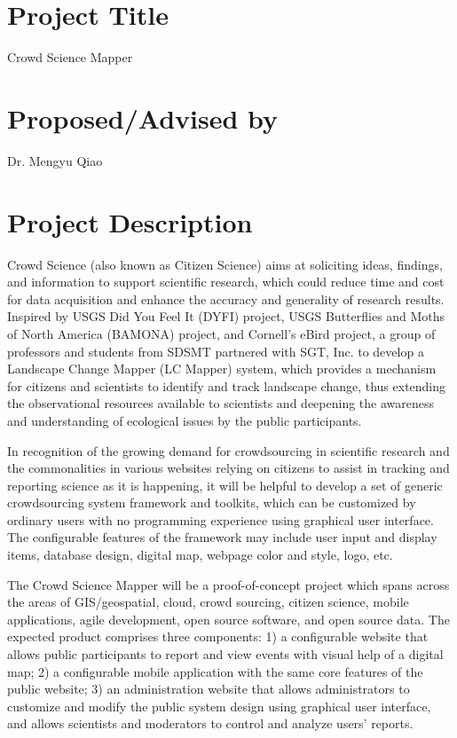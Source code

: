 
\section{Project Title} 
Crowd Science Mapper         

\section{Proposed/Advised by}   
Dr. Mengyu Qiao        
	
\section{Project Description}

Crowd Science (also known as Citizen Science) aims at soliciting ideas, findings, and information to support scientific research, which could reduce time and cost for data acquisition and enhance the accuracy and generality of research results.  Inspired by USGS Did You Feel It (DYFI) project, USGS Butterflies and Moths of North America (BAMONA) project, and Cornell’s eBird project, a group of professors and students from SDSMT partnered with SGT, Inc. to develop a Landscape Change Mapper (LC Mapper) system, which provides a mechanism for citizens and scientists to identify and track landscape change, thus extending the observational resources available to scientists and deepening the awareness and understanding of ecological issues by the public participants.

In recognition of the growing demand for crowdsourcing in scientific research and the commonalities in various websites relying on citizens to assist in tracking and reporting science as it is happening, it will be helpful to develop a set of generic crowdsourcing system framework and toolkits, which can be customized by ordinary users with no programming experience using graphical user interface. The configurable features of the framework may include user input and display items, database design, digital map, webpage color and style, logo, etc. 

The Crowd Science Mapper will be a proof-of-concept project which spans across the areas of GIS/geospatial, cloud, crowd sourcing, citizen science, mobile applications, agile development, open source software, and open source data. The expected product comprises three components: 1) a configurable website that allows public participants to report and view events with visual help of a digital map; 2) a configurable mobile application with the same core features of the public website; 3) an administration website that allows administrators to customize and modify the public system design using graphical user interface, and allows scientists and moderators to control and analyze users’ reports.

